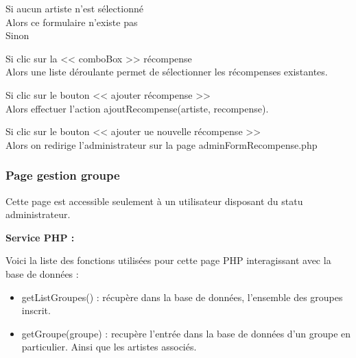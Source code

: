 			\begin{paragraphe}
				Si aucun artiste n'est sélectionné \\
				Alors ce formulaire n'existe pas \\
				Sinon
			\end{paragraphe}

			\begin{paragraphe}
				Si clic sur la << comboBox >> récompense \\
				Alors une liste déroulante permet de sélectionner les récompenses existantes.
			\end{paragraphe}

			\begin{paragraphe}
				Si clic sur le bouton << ajouter récompense >> \\
				Alors effectuer l'action ajoutRecompense(artiste, recompense).
			\end{paragraphe}

			\begin{paragraphe}
				Si clic sur le bouton << ajouter ue nouvelle récompense >> \\
				Alors on redirige l'administrateur sur la page adminFormRecompense.php
			\end{paragraphe}

			\begin{paragraphe}
			\end{paragraphe}

		\subsubsection{Page gestion groupe}

			\begin{paragraphe}
				Cette page est accessible seulement à un utilisateur disposant du statu administrateur.
			\end{paragraphe}

			\begin{paragraphe}
				\textbf{Service PHP :}
			\end{paragraphe}

			\begin{paragraphe}
				Voici la liste des fonctions utilisées pour cette page PHP interagissant avec la base de données :
			\end{paragraphe}

			\begin{paragraphe}
				\begin{itemize}
					\item getListGroupes() : récupère dans la base de données, l'ensemble des groupes inscrit.
					\item getGroupe(groupe) : recupère l'entrée dans la base de données d'un groupe en particulier. Ainsi que les artistes associés.
				\end{itemize}
			\end{paragraphe}

